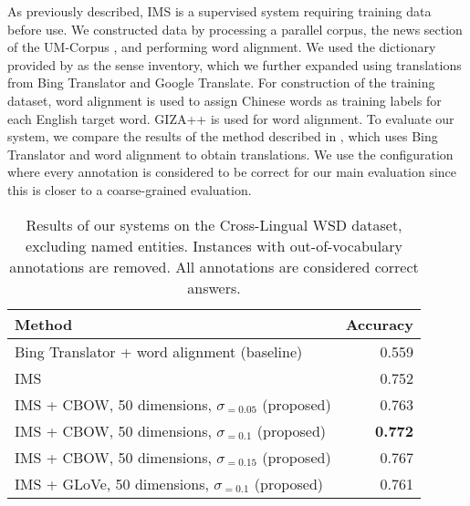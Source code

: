 {As previously described, IMS is a supervised system requiring training data before use. We constructed data by processing a parallel corpus, the news section of the UM-Corpus \cite{tian2014corpus}, and performing word alignment. We used the dictionary provided by \cite{tao2014} as the sense inventory, which we further expanded using translations from Bing Translator and Google Translate. For construction of the training dataset, word alignment is used to assign Chinese words as training labels for each English target word. GIZA++ \cite {och03} is used for word alignment. To evaluate our system, we compare the results of the method described in \cite{tao2014}, which uses Bing Translator and word alignment to obtain translations. We use the configuration where every annotation is considered to be correct for our main evaluation since this is closer to a coarse-grained evaluation. 

\begin{table}[ht]
	\caption{Results of our systems on the Cross-Lingual WSD dataset, excluding named entities. Instances with out-of-vocabulary annotations are removed. All annotations are considered correct answers.}
	\label{table:CLWSD-test-results}
	\begin{center}

			\begin{tabular}{| p{9cm}| r| }
				\hline
				\textbf{Method} & \textbf{Accuracy} \\
				\hline
				Bing Translator + 
                word alignment (baseline) & 0.559  \\
				\hline
				IMS & 0.752  \\
				\hline
                IMS + CBOW, 50 dimensions, $\sigma _{=0.05}$ (proposed) &  0.763  \\
				\hline
				IMS + CBOW, 50 dimensions, $\sigma _{=0.1}$ (proposed) & {\bf 0.772}  \\                                
                \hline
                IMS + CBOW, 50 dimensions, $\sigma _{=0.15}$ (proposed) & 0.767  \\
                \hline
                IMS + GLoVe, 50 dimensions, $\sigma _{=0.1}$ (proposed) & 0.761  \\


				\hline
			\end{tabular}

	\end{center}
\end{table}



}
